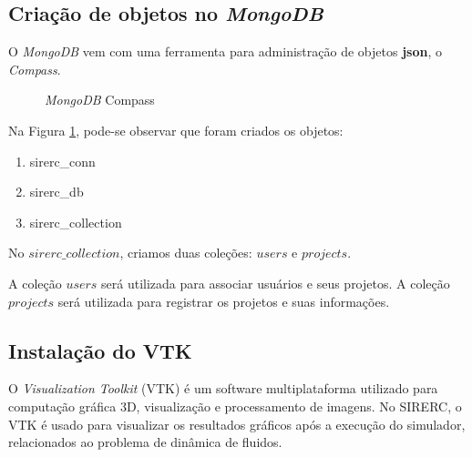 \documentclass[a4paper,11pt]{article}
\newcommand{\sistema}{\textsf{SIRERC}}
\newcommand{\mongo}{\textit{MongoDB}}
\begin{document}
\subsection{Criação de objetos no \mongo{}}

O \mongo{} vem com uma ferramenta para administração de objetos \textbf{json}, o \textit{Compass}.
\begin{figure}[H]
	\centering
	\caption{\mongo{} Compass}\label{fig:mongo_compass}
\end{figure}

Na Figura \ref{fig:mongo_compass}, pode-se observar que foram criados os objetos:
\begin{enumerate}
\item sirerc\_conn
\item sirerc\_db
\item sirerc\_collection
\end{enumerate}

No $sirerc\_collection$, criamos duas coleções: $users$ e $projects$.

A coleção $users$ será utilizada para associar usuários e seus projetos. A coleção $projects$ será utilizada para registrar os projetos e suas informações. 




\color{black}



\subsection{Instalação do VTK}

O \emph{Visualization Toolkit} (VTK) é um software multiplataforma utilizado para computação gráfica 3D, visualização e processamento de imagens. No \sistema{}, o VTK é usado para visualizar os resultados gráficos após a execução do simulador, relacionados ao problema de dinâmica de fluidos.
\end{document}
